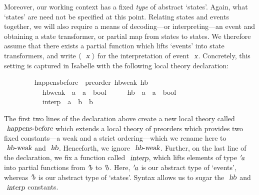 Moreover, our working context has a fixed \emph{type} of abstract `states'.
Again, what `states' are need not be specified at this point.
Relating states and events together, we will also require a means of decoding---or interpreting---an event and obtaining a state transformer, or partial map from states to states.
We therefore assume that there exists a partial function which lifts `events' into state transformers, and write $\langle\ \isa{x}\ \rangle$ for the interpretation of event $\isa{x}$.
Concretely, this setting is captured in Isabelle with the following local theory declaration:
\vspace{0.375em}
\begin{isabellebody}
\ \ \ \ \ \ \ \  happens{\isacharunderscore}before\ {\isacharequal}\ preorder\ hb{\isacharunderscore}weak\ hb\isanewline
\ \ \ \ \ \ \ \ \ \ \ hb{\isacharunderscore}weak\ {\isacharcolon}{\isacharcolon}\ {\isachardoublequoteopen}{\isacharprime}a\ {\isasymRightarrow}\ {\isacharprime}a\ {\isasymRightarrow}\ bool{\isachardoublequoteclose}\ \ {\isacharparenleft}\ {\isachardoublequoteopen}{\isasympreceq}{\isachardoublequoteclose}\ {}{}{\isacharparenright}\ \ hb\ {\isacharcolon}{\isacharcolon}\ {\isachardoublequoteopen}{\isacharprime}a\ {\isasymRightarrow}\ {\isacharprime}a\ {\isasymRightarrow}\ bool{\isachardoublequoteclose}\ \ \ \ \ \ \ {\isacharparenleft}\ {\isachardoublequoteopen}{\isasymprec}{\isachardoublequoteclose}\ {}{}{\isacharparenright}\ {\isacharplus}\isanewline
\ \ \ \ \ \ \ \ \ \ \ interp\ {\isacharcolon}{\isacharcolon}\ {\isachardoublequoteopen}{\isacharprime}a\ {\isasymRightarrow}\ {\isacharprime}b\ {\isasymrightharpoonup}\ {\isacharprime}b{\isachardoublequoteclose}\ {\isacharparenleft}{\isachardoublequoteopen}{\isasymlangle}{\isacharunderscore}{\isasymrangle}{\isachardoublequoteclose}\ {\isacharbrackleft}{}{\isacharbrackright}\ {}{}{}{}{\isacharparenright}
\end{isabellebody}
\vspace{0.375em}
The first two lines of the declaration above create a new local theory called $\isa{happens-before}$ which extends a local theory of preorders which provides two fixed constants---a weak and a strict ordering---which we rename here to $\isa{hb-weak}$ and $\isa{hb}$.
Henceforth, we ignore $\isa{hb-weak}$.
Further, on the last line of the declaration, we fix a function called $\isa{interp}$, which lifts elements of type ${\emph{$\mskip2mu{'}\mskip-2mu$}}a$ into partial functions from ${\emph{$\mskip2mu{'}\mskip-2mu$}}b$ to ${\emph{$\mskip2mu{'}\mskip-2mu$}}b$.
Here, ${\emph{$\mskip2mu{'}\mskip-2mu$}}a$ is our abstract type of `events', whereas ${\emph{$\mskip2mu{'}\mskip-2mu$}}b$ is our abstract type of `states'.
Syntax allows us to sugar the $\isa{hb}$ and $\isa{interp}$ constants.

